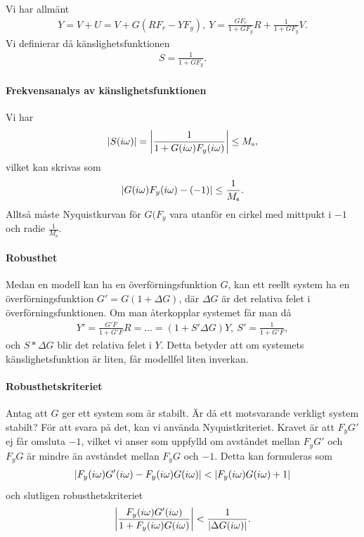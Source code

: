 Vi har allmänt
\begin{align*}
	Y = V + U = V + G(RF_{r} - YF_{y}),\ Y = \frac{GF_{r}}{1 + GF_{y}}R + \frac{1}{1 + GF_{y}}V.
\end{align*}
Vi definierar då känslighetsfunktionen
\begin{align*}
	S = \frac{1}{1 + GF_{y}}.
\end{align*}

\paragraph{Frekvensanalys av känslighetsfunktionen}
Vi har
\begin{align*}
	\abs{S(i\omega)} = \abs{\frac{1}{1 + G(i\omega)F_{y}(i\omega)}} \leq M_{\text{s}},
\end{align*}
vilket kan skrivas som
\begin{align*}
	\abs{G(i\omega)F_{y}(i\omega) - (-1)} \leq \frac{1}{M_{\text{s}}}.
\end{align*}
Alltså måste Nyquistkurvan för $G(F_{y}$ vara utanför en cirkel med mittpukt i $-1$ och radie $\frac{1}{M_{\text{s}}}$.

\paragraph{Robusthet}
Medan en modell kan ha en överförningsfunktion $G$, kan ett reellt system ha en överförningsfunktion $G' = G(1 + \Delta G)$, där $\Delta G$ är det relativa felet i överförningsfunktionen. Om man återkopplar systemet får man då
\begin{align*}
	Y' = \frac{G'F}{1 + G'F}R = \dots = (1 + S'\Delta G)Y,\ S' = \frac{1}{1 + G'F},
\end{align*}
och $S*\Delta G$ blir det relativa felet i $Y$. Detta betyder att om systemets känslighetsfunktion är liten, får modellfel liten inverkan.

\paragraph{Robusthetskriteriet}
Antag att $G$ ger ett system som är stabilt. Är då ett motsvarande verkligt system stabilt? För att svara på det, kan vi använda Nyquistkriteriet. Kravet är att $F_{y}G'$ ej får omsluta $-1$, vilket vi anser som uppfylld om avståndet mellan $F_{y}G'$ och $F_{y}G$ är mindre än avståndet mellan $F_{y}G$ och $-1$. Detta kan formuleras som
\begin{align*}
	\abs{F_{y}(i\omega)G'(i\omega) - F_{y}(i\omega)G(i\omega)} < \abs{F_{y}(i\omega)G(i\omega) + 1}
\end{align*}
och slutligen robusthetskriteriet
\begin{align*}
	\abs{\frac{F_{y}(i\omega)G'(i\omega)}{1 + F_{y}(i\omega)G(i\omega)}} < \frac{1}{\abs{\Delta G(i\omega)}}.
\end{align*}


